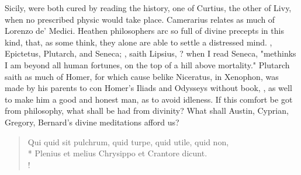 {Sicily, were both cured by reading the history, one of Curtius, the other of Livy, when no prescribed physic would take place. Camerarius relates as much of Lorenzo de' Medici. Heathen philosophers arc so full of divine precepts in this kind, that, as some think, they alone are able to settle a distressed mind. , \etc{} Epictetus, Plutarch, and Seneca; , saith Lipsius, ? when I read Seneca, "methinks I am beyond all human fortunes, on the top of a hill above mortality." Plutarch saith as much of Homer, for which cause belike Niceratus, in Xenophon, was made by his parents to con Homer's Iliads and Odysseys without book, , as well to make him a good and honest man, as to avoid idleness. If this comfort be got from philosophy, what shall be had from divinity? What shall Austin, Cyprian, Gregory, Bernard's divine meditations afford us?

\begin{latin}
\begin{verse}%
Qui quid sit pulchrum, quid turpe, quid utile, quid non,\\*
Plenius et melius Chrysippo et Crantore dicunt.\\!
\end{verse}%
\end{latin}%
\translationrule%
\begin{quote}%
\end{quote}%

}

